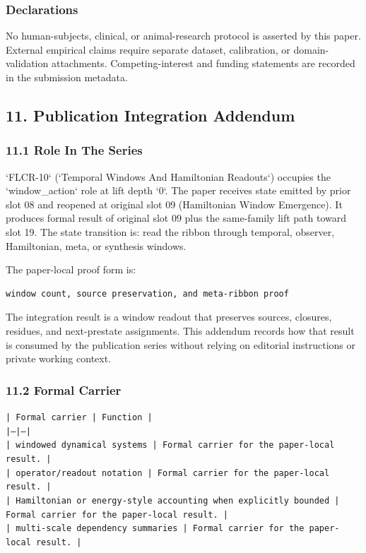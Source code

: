 \documentclass[11pt]{article}
\begin{document}
\subsubsection*{Declarations}

No human-subjects, clinical, or animal-research protocol is asserted by this
paper. External empirical claims require separate dataset, calibration, or
domain-validation attachments. Competing-interest and funding statements are recorded in the submission metadata.

\subsection*{11. Publication Integration Addendum}

\subsubsection*{11.1 Role In The Series}

`FLCR-10` (`Temporal Windows And Hamiltonian Readouts`) occupies the `window\_action` role at lift depth `0`.
The paper receives state emitted by prior slot 08 and reopened at original slot 09 (Hamiltonian Window Emergence). It produces formal result of original slot 09 plus the same-family lift path toward slot 19. The state transition is:
read the ribbon through temporal, observer, Hamiltonian, meta, or synthesis windows.

The paper-local proof form is:

\begin{verbatim}
window count, source preservation, and meta-ribbon proof
\end{verbatim}

The integration result is a window readout that preserves sources, closures, residues, and next-prestate assignments. This addendum records how that result is
consumed by the publication series without relying on editorial instructions or
private working context.

\subsubsection*{11.2 Formal Carrier}

\noindent\texttt{| Formal carrier | Function |}\\
\noindent\texttt{|---|---|}\\
\noindent\texttt{| windowed dynamical systems | Formal carrier for the paper-local result. |}\\
\noindent\texttt{| operator/readout notation | Formal carrier for the paper-local result. |}\\
\noindent\texttt{| Hamiltonian or energy-style accounting when explicitly bounded | Formal carrier for the paper-local result. |}\\
\noindent\texttt{| multi-scale dependency summaries | Formal carrier for the paper-local result. |}\\
\end{document}
